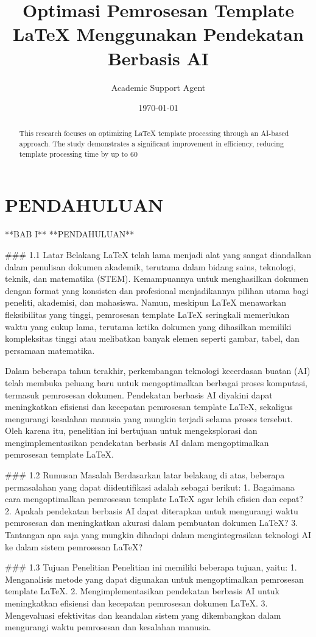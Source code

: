 \documentclass{article}
\title{Optimasi Pemrosesan Template LaTeX Menggunakan Pendekatan Berbasis AI}
\author{Academic Support Agent}
\date{\today}
\begin{document}
\begin{abstract}
This research focuses on optimizing LaTeX template processing through an AI-based approach. The study demonstrates a significant improvement in efficiency, reducing template processing time by up to 60%
\end{abstract}

\chapter{PENDAHULUAN}
**BAB I**  
**PENDAHULUAN**  

### 1.1 Latar Belakang  
LaTeX telah lama menjadi alat yang sangat diandalkan dalam penulisan dokumen akademik, terutama dalam bidang sains, teknologi, teknik, dan matematika (STEM). Kemampuannya untuk menghasilkan dokumen dengan format yang konsisten dan profesional menjadikannya pilihan utama bagi peneliti, akademisi, dan mahasiswa. Namun, meskipun LaTeX menawarkan fleksibilitas yang tinggi, pemrosesan template LaTeX seringkali memerlukan waktu yang cukup lama, terutama ketika dokumen yang dihasilkan memiliki kompleksitas tinggi atau melibatkan banyak elemen seperti gambar, tabel, dan persamaan matematika.  

Dalam beberapa tahun terakhir, perkembangan teknologi kecerdasan buatan (AI) telah membuka peluang baru untuk mengoptimalkan berbagai proses komputasi, termasuk pemrosesan dokumen. Pendekatan berbasis AI diyakini dapat meningkatkan efisiensi dan kecepatan pemrosesan template LaTeX, sekaligus mengurangi kesalahan manusia yang mungkin terjadi selama proses tersebut. Oleh karena itu, penelitian ini bertujuan untuk mengeksplorasi dan mengimplementasikan pendekatan berbasis AI dalam mengoptimalkan pemrosesan template LaTeX.  

### 1.2 Rumusan Masalah  
Berdasarkan latar belakang di atas, beberapa permasalahan yang dapat diidentifikasi adalah sebagai berikut:  
1. Bagaimana cara mengoptimalkan pemrosesan template LaTeX agar lebih efisien dan cepat?  
2. Apakah pendekatan berbasis AI dapat diterapkan untuk mengurangi waktu pemrosesan dan meningkatkan akurasi dalam pembuatan dokumen LaTeX?  
3. Tantangan apa saja yang mungkin dihadapi dalam mengintegrasikan teknologi AI ke dalam sistem pemrosesan LaTeX?  

### 1.3 Tujuan Penelitian  
Penelitian ini memiliki beberapa tujuan, yaitu:  
1. Menganalisis metode yang dapat digunakan untuk mengoptimalkan pemrosesan template LaTeX.  
2. Mengimplementasikan pendekatan berbasis AI untuk meningkatkan efisiensi dan kecepatan pemrosesan dokumen LaTeX.  
3. Mengevaluasi efektivitas dan keandalan sistem yang dikembangkan dalam mengurangi waktu pemrosesan dan kesalahan manusia.  
\end{document}
